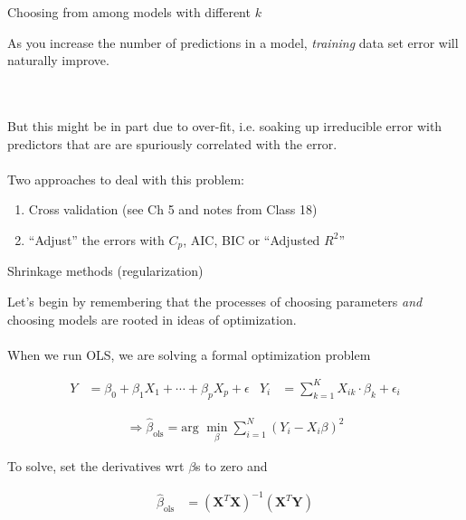 \documentclass[mathserif, aspectratio=169]{beamer}
\begin{document}
\begin{frame}{Choosing from among models with different $k$}

As you increase the number of predictions in a model, \textit{training} data set error will naturally improve.  \\~\\\

But this might be in part due to over-fit, i.e. soaking up irreducible error with predictors that are are spuriously correlated with the error. \\~\\

Two approaches to deal with this problem:

\begin{enumerate}
\item Cross validation (see Ch 5 and notes from Class 18)
\item ``Adjust'' the errors with $C_p$, AIC, BIC or ``Adjusted $R^2$''
\end{enumerate}

\end{frame}



\begin{frame}{Shrinkage methods (regularization)}

Let's begin by remembering that the processes of choosing parameters \textit{and} choosing models are rooted in ideas of optimization.\\~\\

When we run OLS, we are solving a formal optimization problem

\begin{align*}
Y &= \beta_0+\beta_1X_1+\cdots+\beta_p X_p+\epsilon & Y_i &= \sum_{k=1}^{K} X_{ik} \cdot \beta_k +\epsilon_i
\end{align*}

\begin{align*}
\Rightarrow \hat{\beta}_\text{ols} = \text{arg }\min_\beta \sum_{i=1}^N \left(Y_i - X_i \beta \right)^2
\end{align*}

To solve, set the derivatives wrt $\beta$s to zero and 

\begin{align*}
\hat{\beta}_\text{ols} &= \left(\mathbf{X}^T\mathbf{X}\right)^{-1} \left(\mathbf{X}^T\mathbf{Y}\right)
\end{align*}

\end{frame}
\end{document}
